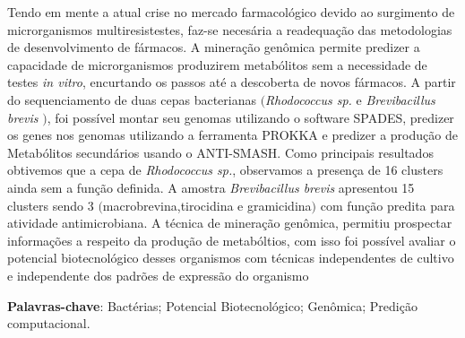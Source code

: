 \setlength{\absparsep}{18pt} %
\begin{resumo}

Tendo em mente a atual crise no mercado farmacológico devido ao surgimento de microrganismos
multiresistestes, faz-se necesária a readequação das metodologias de desenvolvimento de fármacos.
A mineração genômica permite predizer a capacidade de microrganismos produzirem
metabólitos sem a necessidade de testes \textit{in vitro}, encurtando os passos
até a descoberta de novos fármacos. A partir do sequenciamento de duas cepas
bacterianas $($\textit{Rhodococcus sp.} e \textit{Brevibacillus brevis} $)$, foi 
possível montar seu genomas utilizando o software SPADES, predizer os genes nos
genomas utilizando a ferramenta PROKKA e predizer a produção de Metabólitos 
secundários usando o ANTI-SMASH.  Como principais resultados obtivemos que a cepa
de \textit{Rhodococcus sp.}, observamos a presença de 16 clusters ainda sem a função definida.
A amostra \textit{Brevibacillus brevis} apresentou 15 clusters sendo 3 $($macrobrevina,tirocidina e gramicidina$)$ com função predita
para atividade antimicrobiana. A técnica de mineração genômica, permitiu prospectar informações
a respeito da produção de metabóltios, com isso foi possível avaliar o potencial biotecnológico
desses organismos com técnicas independentes de cultivo e independente dos 
padrões de expressão do organismo

\vspace{\onelineskip}
\noindent 
\textbf{Palavras-chave}: Bactérias; Potencial Biotecnológico; Genômica; Predição computacional.

\end{resumo}

